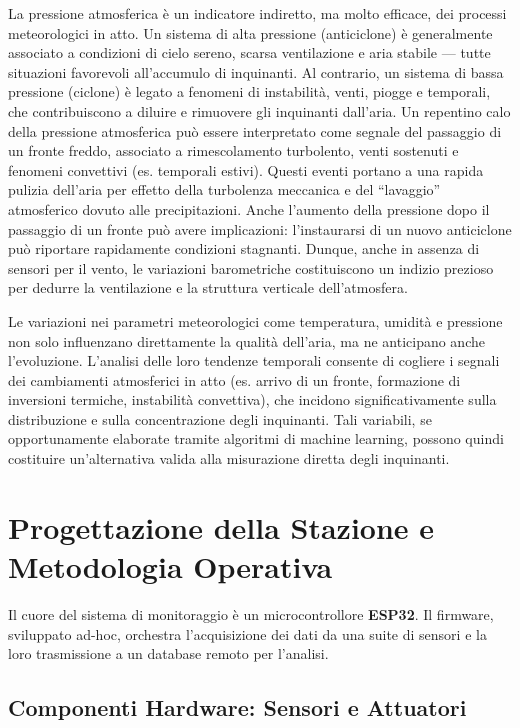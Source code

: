 \documentclass[fleqn,10pt]{SelfArx} %
\begin{document}
La pressione atmosferica è un indicatore indiretto, ma molto efficace, dei processi meteorologici in atto. Un sistema di alta pressione (anticiclone) è generalmente associato a condizioni di cielo sereno, scarsa ventilazione e aria stabile — tutte situazioni favorevoli all’accumulo di inquinanti. Al contrario, un sistema di bassa pressione (ciclone) è legato a fenomeni di instabilità, venti, piogge e temporali, che contribuiscono a diluire e rimuovere gli inquinanti dall’aria.
Un repentino calo della pressione atmosferica può essere interpretato come segnale del passaggio di un fronte freddo, associato a rimescolamento turbolento, venti sostenuti e fenomeni convettivi (es. temporali estivi). Questi eventi portano a una rapida pulizia dell’aria per effetto della turbolenza meccanica e del “lavaggio” atmosferico dovuto alle precipitazioni. Anche l’aumento della pressione dopo il passaggio di un fronte può avere implicazioni: l’instaurarsi di un nuovo anticiclone può riportare rapidamente condizioni stagnanti.
Dunque, anche in assenza di sensori per il vento, le variazioni barometriche costituiscono un indizio prezioso per dedurre la ventilazione e la struttura verticale dell’atmosfera.

Le variazioni nei parametri meteorologici come temperatura, umidità e pressione non solo influenzano direttamente la qualità dell’aria, ma ne anticipano anche l’evoluzione. L’analisi delle loro tendenze temporali consente di cogliere i segnali dei cambiamenti atmosferici in atto (es. arrivo di un fronte, formazione di inversioni termiche, instabilità convettiva), che incidono significativamente sulla distribuzione e sulla concentrazione degli inquinanti. Tali variabili, se opportunamente elaborate tramite algoritmi di machine learning, possono quindi costituire un’alternativa valida alla misurazione diretta degli inquinanti.

\section{Progettazione della Stazione e Metodologia Operativa}

Il cuore del sistema di monitoraggio è un microcontrollore \textbf{ESP32}. Il firmware, sviluppato ad-hoc, orchestra l'acquisizione dei dati da una suite di sensori e la loro trasmissione a un database remoto per l'analisi.

\subsection{Componenti Hardware: Sensori e Attuatori}
\end{document}
